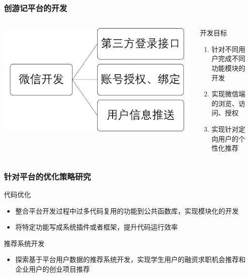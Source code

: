 \documentclass{beamer}
\begin{document}
\begin{frame}
  \frametitle{创游记平台的开发}
  \begin{columns}
    \begin{column}{0.50\textwidth}
      \includegraphics[width=\textwidth]{./img/web_weixin.png}
    \end{column}
    \begin{column}{0.50\textwidth}
      \begin{block}{开发目标}
        \begin{enumerate}
          \item 针对不同用户完成不同功能模块的开发
          \item 实现微信端的浏览、访问、授权
          \item 实现针对定向用户的个性化推荐
        \end{enumerate}
      \end{block}
    \end{column}
  \end{columns}
\end{frame}

\begin{frame}
\frametitle{针对平台的优化策略研究}
  \begin{block}{代码优化 }
  	\begin{itemize}
  		\item 整合平台开发过程中过多代码复用的功能到公共函数库，实现模块化的开发
  		\item 将特定功能写成系统插件或者框架，提升代码运行效率
  	\end{itemize}
  \end{block}
  \begin{block}{推荐系统开发}
  	\begin{itemize}
  		\item 探索基于平台用户数据的推荐系统开发，实现学生用户的融资求职机会推荐和企业用户的创业项目推荐
  	\end{itemize}
  \end{block}
\end{frame}
\end{document}
